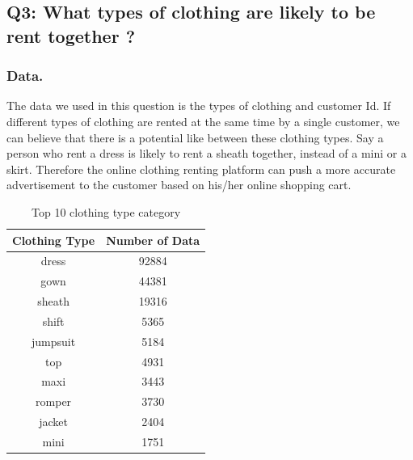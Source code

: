 \documentclass[sigconf]{acmart}
\begin{document}
\begin{table}[htbp]
\centering
\small
    \caption{Document Classification Accuracy on the full dataset. "Overall" denotes the micro-average of the accuracy listed.\label{table:perf}}

\end{table}



\subsection{Q3: What types of clothing are likely to be rent together ?}
\subsubsection{Data.} 
The data we used in this question is the types of clothing and customer Id. If different types of clothing are rented at the same time by a single customer, we can believe that there is a potential like between these clothing types. Say a person who rent a dress is likely to rent a sheath together, instead of a mini or a skirt. Therefore the online clothing renting platform can push a more accurate advertisement to the customer based on his/her online shopping cart.

\begin{table}[htbp]
\caption{Top 10 clothing type category} %
\centering %
\begin{tabular}{c c} %
\hline\hline %
Clothing Type & Number of Data \\ [0.5ex] %
\hline %
dress & 92884 \\ %
gown & 44381 \\
sheath & 19316 \\
shift & 5365 \\
jumpsuit & 5184 \\ 
top & 4931 \\ 
maxi & 3443 \\ 
romper & 3730 \\ 
jacket & 2404 \\
mini & 1751 \\
[1ex] %
\hline %
\end{tabular}
\label{table:nonlin} %
\end{table}
\end{document}
